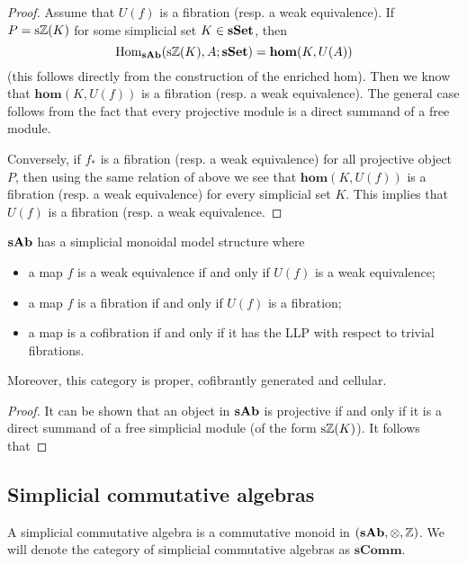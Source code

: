 \begin{refsection}
\begin{proof}
Assume that $U(f)$ is a fibration (resp. a weak equivalence). If $P = \mathrm s \mathbb{Z}(K)$ for some simplicial set $K \in \mathbf{sSet}$, then
\[
\mathrm{Hom}_{\mathbf{s \mathbf{Ab}}}(\mathrm s \mathbb{Z}(K),A;\mathbf{sSet}) = \mathbf{hom}(K, U(A))
\]
(this follows directly from the construction of the enriched hom). Then we know that $\mathbf{hom}(K,U(f))$ is a fibration (resp. a weak equivalence). The general case follows from the fact that every projective module is a direct summand of a free module.

Conversely, if $f_*$ is a fibration (resp. a weak equivalence) for all projective object $P$, then using the same relation of above we see that $\mathbf{hom}(K,U(f))$ is a fibration (resp. a weak equivalence) for every simplicial set $K$. This implies that $U(f)$ is a fibration (resp. a weak equivalence.
\end{proof}

\begin{thm} \label{thm simplicial groups}
$\mathbf s \mathbf{Ab}$ has a simplicial monoidal model structure where
\begin{itemize}
\item a map $f$ is a weak equivalence if and only if $U(f)$ is a weak equivalence;
\item a map $f$ is a fibration if and only if $U(f)$ is a fibration;
\item a map is a cofibration if and only if it has the LLP with respect to trivial fibrations.
\end{itemize}
Moreover, this category is proper, cofibrantly generated and cellular.
\end{thm}

\begin{proof}
It can be shown that an object in $\mathbf s \mathbf{Ab}$ is projective if and only if it is a direct summand of a free simplicial module (of the form $\mathrm s \mathbb{Z}(K)$). It follows that 
\end{proof}

\subsection{Simplicial commutative algebras}

\begin{defin}
A simplicial commutative algebra is a commutative monoid in $(\mathbf s \mathbf{Ab}, \otimes, \mathbb{Z})$. We will denote the category of simplicial commutative algebras as $\mathbf s \mathbf{Comm}$.
\end{defin}


\end{refsection}
